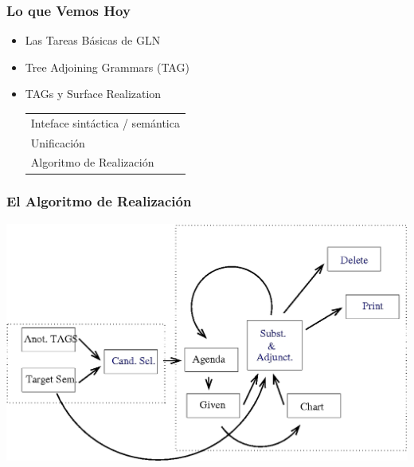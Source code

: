 \documentclass[compress,color=usenames]{beamer}
\begin{document}
\begin{frame}
\frametitle{Lo que Vemos Hoy}

\begin{itemize}
\item Las Tareas B\'asicas de GLN
\item Tree Adjoining Grammars (TAG)
\item TAGs y Surface Realization
\begin{tabular}{|l}
Inteface sint\'actica / sem\'antica\\
Unificaci\'on\\
Algoritmo de Realizaci\'on
\end{tabular}
\end{itemize}
\end{frame}

\begin{frame}
\frametitle{El Algoritmo de Realizaci\'on}

\begin{center}
\includegraphics[scale=.32]{pics/gen.jpg}
\end{center}
\end{frame}
\end{document}
